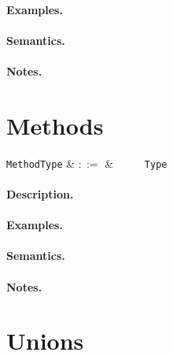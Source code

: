 \paragraph{Examples.}

\paragraph{Semantics.}

\paragraph{Notes.}


\section{Methods}

\begin{syntax}
  \verb+MethodType+ & $::=$ & \ \token{(}\
  \ \token{)}\ \token{=>}\ \verb+Type+\\
\end{syntax}

\paragraph{Description.}  

\paragraph{Examples.}

\paragraph{Semantics.}

\paragraph{Notes.}


\section{Unions}
\label{c_types_unions}

